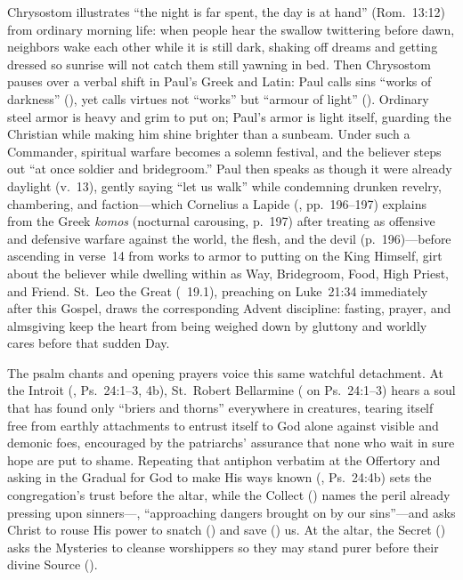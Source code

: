 Chrysostom illustrates ``the night is far spent, the day is at hand'' (Rom.~13:12) from ordinary morning life: when people hear the swallow twittering before dawn, neighbors wake each other while it is still dark, shaking off dreams and getting dressed so sunrise will not catch them still yawning in bed. Then Chrysostom pauses over a verbal shift in Paul's Greek and Latin: Paul calls sins ``works of darkness'' (), yet calls virtues not ``works'' but ``armour of light'' (). Ordinary steel armor is heavy and grim to put on; Paul's armor is light itself, guarding the Christian while making him shine brighter than a sunbeam. Under such a Commander, spiritual warfare becomes a solemn festival, and the believer steps out ``at once soldier and bridegroom.'' Paul then speaks as though it were already daylight (v.~13), gently saying ``let us walk'' while condemning drunken revelry, chambering, and faction---which Cornelius a Lapide (, pp.~196--197) explains from the Greek \emph{komos} (nocturnal carousing, p.~197) after treating  as offensive and defensive warfare against the world, the flesh, and the devil (p.~196)---before ascending in verse~14 from works to armor to putting on the King Himself, girt about the believer while dwelling within as Way, Bridegroom, Food, High Priest, and Friend. St.~Leo the Great (~19.1), preaching on Luke~21:34 immediately after this Gospel, draws the corresponding Advent discipline: fasting, prayer, and almsgiving keep the heart from being weighed down by gluttony and worldly cares before that sudden Day.

The psalm chants and opening prayers voice this same watchful detachment. At the Introit (, Ps.~24:1--3, 4b), St.~Robert Bellarmine ( on Ps.~24:1--3) hears a soul that has found only ``briers and thorns'' everywhere in creatures, tearing itself free from earthly attachments to entrust itself to God alone against visible and demonic foes, encouraged by the patriarchs' assurance that none who wait in sure hope are put to shame. Repeating that antiphon verbatim at the Offertory and asking in the Gradual for God to make His ways known (, Ps.~24:4b) sets the congregation's trust before the altar, while the Collect () names the peril already pressing upon sinners---, ``approaching dangers brought on by our sins''---and asks Christ to rouse His power to snatch () and save () us. At the altar, the Secret () asks the Mysteries to cleanse worshippers so they may stand purer before their divine Source ().

